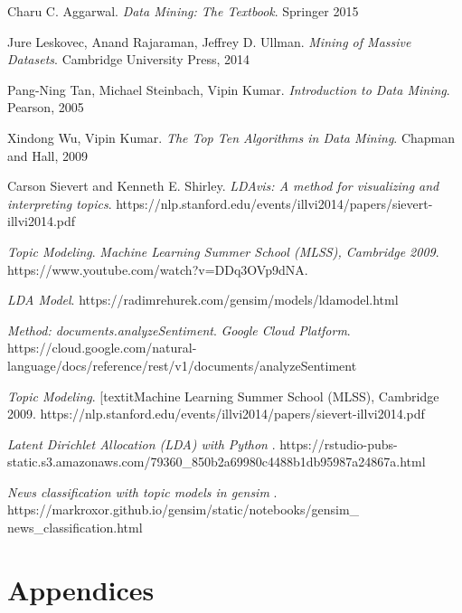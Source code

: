 \documentclass{neu_handout}
\begin{document}
\begin{thebibliography}{9}

Charu C. Aggarwal. 
\textit{Data Mining: The Textbook}. 
Springer 2015

Jure Leskovec, Anand Rajaraman, Jeffrey D. Ullman. 
\textit{Mining of Massive Datasets}. 
Cambridge University Press, 2014

Pang-Ning Tan, Michael Steinbach, Vipin Kumar. 
\textit{Introduction to Data Mining}. 
Pearson, 2005

Xindong Wu, Vipin Kumar.
\textit{The Top Ten Algorithms in Data Mining}. 
Chapman and Hall, 2009

Carson Sievert and Kenneth E. Shirley. 
\textit{LDAvis: A method for visualizing and interpreting topics}. 
https://nlp.stanford.edu/events/illvi2014/papers/sievert-illvi2014.pdf
 
\textit{Topic Modeling}.
\textit{Machine Learning Summer School (MLSS), Cambridge 2009}. 
https://www.youtube.com/watch?v=DDq3OVp9dNA.

\textit{LDA Model}.
https://radimrehurek.com/gensim/models/ldamodel.html

\textit{Method: documents.analyzeSentiment}.
\textit{Google Cloud Platform}. 
https://cloud.google.com/natural-language/docs/reference/rest/v1/documents/analyzeSentiment


\textit{Topic Modeling}.
[textit{Machine Learning Summer School (MLSS), Cambridge 2009}. 
https://nlp.stanford.edu/events/illvi2014/papers/sievert-illvi2014.pdf

\textit{Latent Dirichlet Allocation (LDA) with Python
}.
https://rstudio-pubs-static.s3.amazonaws.com/79360\_850b2a69980c4488b1db95987a24867a.html


\textit{News classification with topic models in gensim
}.
https://markroxor.github.io/gensim/static/notebooks/gensim\_
news\_classification.html

\end{thebibliography}



\appendix
\section{Appendices}
\end{document}
